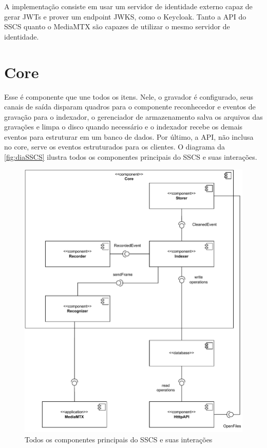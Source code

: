 \documentclass[12pt, %
openright, 
oneside, %
a4paper,    %
brazil]{facom-ufu-abntex2}
\begin{document}
A implementação consiste em usar um servidor de identidade externo capaz de
gerar JWTs e prover um endpoint JWKS, como o Keycloak. Tanto a API do SSCS
quanto o MediaMTX são capazes de utilizar o mesmo servidor de identidade.

\section{Core}

Esse é componente que une todos os itens. Nele, o gravador é configurado, seus
canais de saída disparam quadros para o componente reconhecedor e eventos de
gravação para o indexador, o gerenciador de armazenamento salva os arquivos das
gravações e limpa o disco quando necessário e o indexador recebe os demais
eventos para estruturar em um banco de dados. Por último, a API, não inclusa no
core, serve os eventos estruturados para os clientes. O diagrama da
\autoref{fig:diaSSCS} ilustra todos os componentes principais do SSCS e suas
interações.

\begin{figure}[!ht]
	\centering
	\includegraphics[width=1.0\linewidth]{core.pdf}
	\caption[Diagrama geral do SSCS]{Todos os componentes principais do
		SSCS e suas interações}
	\label{fig:diaSSCS}
\end{figure}
\end{document}
